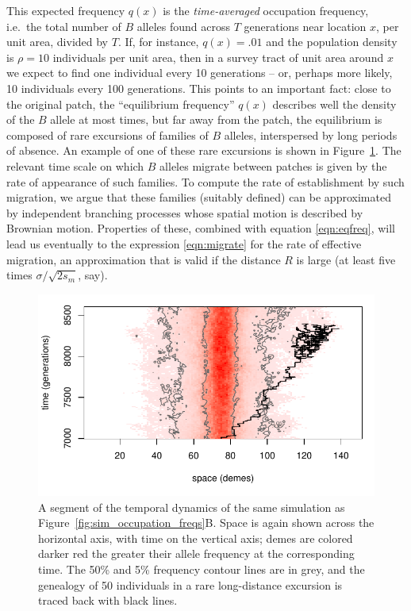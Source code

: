 \documentclass{article}
\begin{document}
This expected frequency $q(x)$ is the \emph{time-averaged} occupation frequency,
i.e.\ the total number of $B$ alleles found across $T$ generations near location $x$, per unit area, divided by $T$.
If, for instance, $q(x)=.01$ and the population density is $\rho=10$ individuals per unit area, 
then in a survey tract of unit area around $x$ we expect to find one individual every 10 generations
-- or, perhaps more likely, 10 individuals every 100 generations.
This points to an important fact: 
close to the original patch, the ``equilibrium frequency'' $q(x)$ describes well the density of the $B$ allele at most times,
but far away from the patch, 
the equilibrium is composed of rare excursions of families of $B$
alleles, interspersed by long periods of absence. 
An example of one of these rare excursions is shown in Figure~\ref{fig:sim_snapshots}.
The relevant time scale on which $B$ alleles migrate between patches is given by the rate of appearance of such families.
To compute the rate of establishment by such migration,
we argue that these families (suitably defined) can be approximated by
independent branching processes whose spatial motion is described by Brownian motion.
Properties of these, combined with equation \eqref{eqn:eqfreq},
will lead us eventually to the expression \eqref{eqn:migrate} for the rate of effective migration,
an approximation that is valid if the distance $R$ is large (at least five times $\sigma/\sqrt{2s_m}$, say).

\begin{figure}[ht!]
  \begin{center}
    \includegraphics{sim-snapshots}
  \end{center}
  \caption{
  A segment of the temporal dynamics of the same simulation as Figure~\ref{fig:sim_occupation_freqs}B.
  Space is again shown across the horizontal axis, with time on the vertical axis; 
  demes are colored darker red the greater their allele frequency at the corresponding time.
  The 50\% and 5\% frequency contour lines are in grey,
  and the genealogy of 50 individuals in a rare long-distance excursion is traced back with black lines.
  }   \label{fig:sim_snapshots}
\end{figure}
\end{document}
